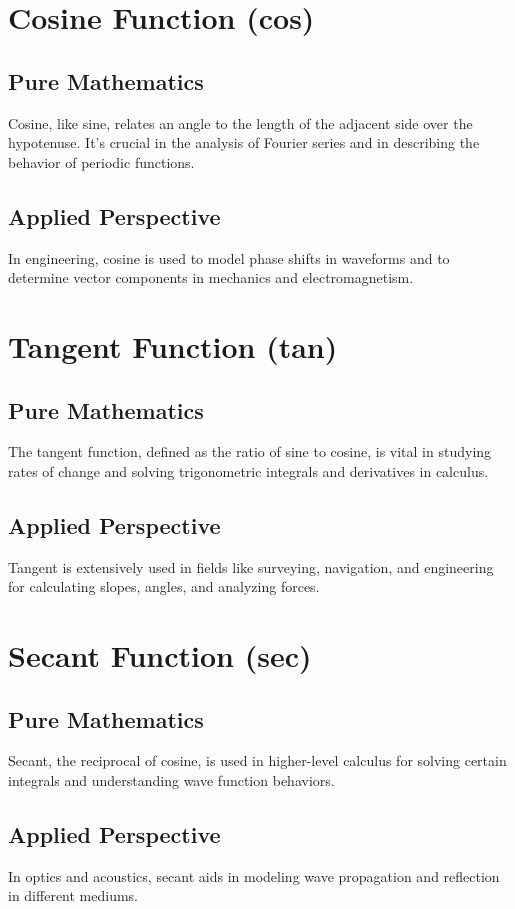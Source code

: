 \documentclass[a4paper,12pt]{book}
\begin{document}
\section*{Cosine Function (cos)}
\subsection*{Pure Mathematics}
Cosine, like sine, relates an angle to the length of the adjacent side over the hypotenuse. It's crucial in the analysis of Fourier series and in describing the behavior of periodic functions.

\subsection*{Applied Perspective}
In engineering, cosine is used to model phase shifts in waveforms and to determine vector components in mechanics and electromagnetism.

\section*{Tangent Function (tan)}
\subsection*{Pure Mathematics}
The tangent function, defined as the ratio of sine to cosine, is vital in studying rates of change and solving trigonometric integrals and derivatives in calculus.

\subsection*{Applied Perspective}
Tangent is extensively used in fields like surveying, navigation, and engineering for calculating slopes, angles, and analyzing forces.

\section*{Secant Function (sec)}
\subsection*{Pure Mathematics}
Secant, the reciprocal of cosine, is used in higher-level calculus for solving certain integrals and understanding wave function behaviors.

\subsection*{Applied Perspective}
In optics and acoustics, secant aids in modeling wave propagation and reflection in different mediums.
\end{document}
